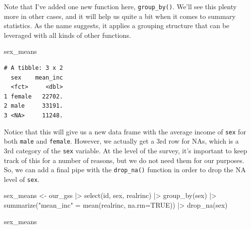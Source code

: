 \documentclass[
  letterpaper,
  DIV=11,
  numbers=noendperiod]{scrreprt}
\newenvironment{Shaded}{\begin{snugshade}}{\end{snugshade}}
\newcommand{\AttributeTok}[1]{\textcolor[rgb]{0.40,0.45,0.13}{#1}}
\newcommand{\ConstantTok}[1]{\textcolor[rgb]{0.56,0.35,0.01}{#1}}
\newcommand{\FunctionTok}[1]{\textcolor[rgb]{0.28,0.35,0.67}{#1}}
\newcommand{\NormalTok}[1]{\textcolor[rgb]{0.00,0.23,0.31}{#1}}
\newcommand{\OtherTok}[1]{\textcolor[rgb]{0.00,0.23,0.31}{#1}}
\newcommand{\SpecialCharTok}[1]{\textcolor[rgb]{0.37,0.37,0.37}{#1}}
\newcommand{\StringTok}[1]{\textcolor[rgb]{0.13,0.47,0.30}{#1}}
\begin{document}
\begin{tcolorbox}[enhanced jigsaw, left=2mm, title=\textcolor{quarto-callout-note-color}{\faInfo}\hspace{0.5em}{Note}, colframe=quarto-callout-note-color-frame, toptitle=1mm, bottomtitle=1mm, opacitybacktitle=0.6, titlerule=0mm, breakable, opacityback=0, coltitle=black, arc=.35mm, colback=white, leftrule=.75mm, toprule=.15mm, bottomrule=.15mm, colbacktitle=quarto-callout-note-color!10!white, rightrule=.15mm]

Note that I've added one new function here, \texttt{group\_by()}. We'll
see this plenty more in other cases, and it will help us quite a bit
when it comes to summary statistics. As the name suggests, it applies a
grouping structure that can be leveraged with all kinds of other
functions.

\end{tcolorbox}

\begin{Shaded}
\begin{Highlighting}[]
\NormalTok{sex\_means}
\end{Highlighting}
\end{Shaded}

\begin{verbatim}
# A tibble: 3 x 2
  sex    mean_inc
  <fct>     <dbl>
1 female   22702.
2 male     33191.
3 <NA>     11248.
\end{verbatim}

Notice that this will give us a new data frame with the average income
of \texttt{sex} for both \texttt{male} and \texttt{female}. However, we
actually get a 3rd row for NAs, which is a 3rd category of the
\texttt{sex} variable. At the level of the survey, it's important to
keep track of this for a number of reasons, but we do not need them for
our purposes. So, we can add a final pipe with the \texttt{drop\_na()}
function in order to drop the NA level of \texttt{sex}.

\begin{Shaded}
\begin{Highlighting}[]
\NormalTok{sex\_means }\OtherTok{\textless{}{-}}\NormalTok{ our\_gss }\SpecialCharTok{|\textgreater{}}
  \FunctionTok{select}\NormalTok{(id, sex, realrinc) }\SpecialCharTok{|\textgreater{}}
  \FunctionTok{group\_by}\NormalTok{(sex) }\SpecialCharTok{|\textgreater{}}
  \FunctionTok{summarize}\NormalTok{(}\StringTok{"mean\_inc"} \OtherTok{=} \FunctionTok{mean}\NormalTok{(realrinc, }\AttributeTok{na.rm=}\ConstantTok{TRUE}\NormalTok{)) }\SpecialCharTok{|\textgreater{}}
  \FunctionTok{drop\_na}\NormalTok{(sex)}

\NormalTok{sex\_means}
\end{Highlighting}
\end{Shaded}
\end{document}
